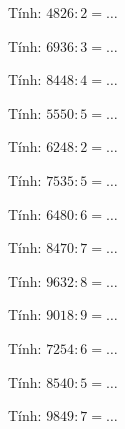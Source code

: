 \begin{ex}
Tính: $4826 : 2 = \dots$
\end{ex}

\begin{ex}
Tính: $6936 : 3 = \dots$
\end{ex}

\begin{ex}
Tính: $8448 : 4 = \dots$
\end{ex}

\begin{ex}
Tính: $5550 : 5 = \dots$
\end{ex}

\begin{ex}
Tính: $6248 : 2 = \dots$
\end{ex}

\begin{ex}
Tính: $7535 : 5 = \dots$
\end{ex}

\begin{ex}
Tính: $6480 : 6 = \dots$
\end{ex}

\begin{ex}
Tính: $8470 : 7 = \dots$
\end{ex}

\begin{ex}
Tính: $9632 : 8 = \dots$
\end{ex}

\begin{ex}
Tính: $9018 : 9 = \dots$
\end{ex}

\begin{ex}
Tính: $7254 : 6 = \dots$
\end{ex}

\begin{ex}
Tính: $8540 : 5 = \dots$
\end{ex}

\begin{ex}
Tính: $9849 : 7 = \dots$
\end{ex}

